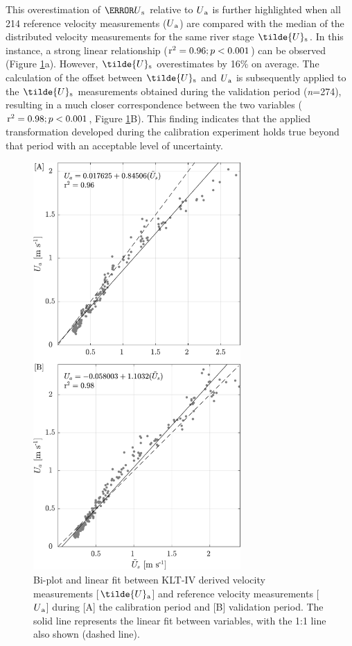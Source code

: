 \documentclass[hess, manuscript]{copernicus} %
\begin{document}

This overestimation of $\bar{U}\textsubscript{s}$ relative to $U\textsubscript{a}$ is further highlighted when all 214 reference velocity measurements ($U\textsubscript{a}$) are compared with the median of the distributed velocity measurements for the same river stage $\tilde{U}\textsubscript{s}$. In this instance, a strong linear relationship ($\textnormal{r\textsuperscript{2}} = 0.96; p < 0.001$) can be observed (Figure \ref{Figure7}a). However, $\tilde{U}\textsubscript{s}$ overestimates by 16\% on average. The calculation of the offset between $\tilde{U}\textsubscript{s}$ and $U\textsubscript{a}$ is subsequently applied to the $\tilde{U}\textsubscript{s}$ measurements obtained during the validation period (\textit{n}=274), resulting in a much closer correspondence between the two variables ($\textnormal{r\textsuperscript{2}} = 0.98; p < 0.001$, Figure \ref{Figure7}B). This finding indicates that the applied transformation developed during the calibration experiment holds true beyond that period with an acceptable level of uncertainty.

\begin{figure}[!htb]
\centering 
\includegraphics[width=7.9cm]{Main/Initial_submission_2024/Figures/Figure7.pdf}
\caption{Bi-plot and linear fit between KLT-IV derived velocity measurements [$\tilde{U}\textsubscript{a}$] and reference velocity measurements [$U\textsubscript{a}$] during [A] the calibration period and [B] validation period. The solid line represents the linear fit between variables, with the 1:1 line also shown (dashed line).}
\label{Figure7} 
\end{figure}
\end{document}
